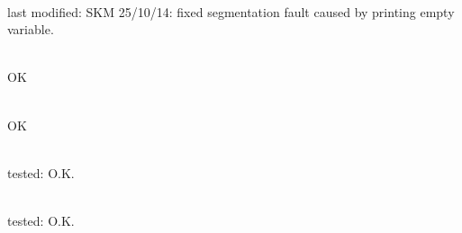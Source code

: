 \begin{DoxyRefList}
\item[Member \doxylink{classcsmp_1_1_property_database_a50d39883deae8513cb9eb399307b9a28}{csmp\+::Property\+Database\texorpdfstring{$<$}{<} dim \texorpdfstring{$>$}{>}\+::List\+Variable\+Names} () const]\hfill \\
\label{test__test000053}%
%
last modified\+: SKM 25/10/14\+: fixed segmentation fault caused by printing empty variable.  
\item[Member \doxylink{classcsmp_1_1_region_interface_afc081b026c8c072b1fef0c9df85b6ce6}{csmp\+::Region\+Interface\texorpdfstring{$<$}{<} dim, REGION\+\_\+\+COMPLEX \texorpdfstring{$>$}{>}\+::Move\+To\+Non\+Unique\+Regions} (const char \texorpdfstring{$\ast$}{*}unique\+\_\+region)]\hfill \\
\label{test__test000055}%
%
OK  
\item[Member \doxylink{classcsmp_1_1_region_interface_afdc209398fea9597da430153ace32208}{csmp\+::Region\+Interface\texorpdfstring{$<$}{<} dim, REGION\+\_\+\+COMPLEX \texorpdfstring{$>$}{>}\+::Remove\+From\+Region} (const char \texorpdfstring{$\ast$}{*}region, const char \texorpdfstring{$\ast$}{*}region\+\_\+to\+\_\+subtract)]\hfill \\
\label{test__test000054}%
%
OK  
\item[Member \doxylink{classcsmp_1_1_stochastic_permeability_field_interface_ad6941bbf713af021e318681e208d13fe}{csmp\+::Stochastic\+Permeability\+Field\+Interface\texorpdfstring{$<$}{<} dim \texorpdfstring{$>$}{>}\+::Read2\+DStochastic\+Permeability\+Field} (\doxylink{classcsmp_1_1_model}{Model$<$ dim $>$} \&, const char \texorpdfstring{$\ast$}{*}fname)]\hfill \\
\label{test__test000030}%
%
tested\+: O.\+K.  
\item[Member \doxylink{classcsmp_1_1_stochastic_permeability_field_interface_aef200217723991702ed44b5887326330}{csmp\+::Stochastic\+Permeability\+Field\+Interface\texorpdfstring{$<$}{<} dim \texorpdfstring{$>$}{>}\+::Read2\+DStochastic\+Permeability\+Field\+On\+Regular\+Grid} (\doxylink{classcsmp_1_1_model}{Model$<$ dim $>$} \&, const char \texorpdfstring{$\ast$}{*}fname)]\hfill \\
\label{test__test000029}%
%
tested\+: O.\+K.  
\item[Class \doxylink{classcsmp_1_1_stress_invariants}{csmp\+::Stress\+Invariants} ]\hfill \\
\label{test__test000074}%
%
 

\end{DoxyRefList}
